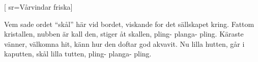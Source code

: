 [ 							
	sr={Vårvindar friska}]		
	
\beginverse*						
Vem sade ordet ``skål'' här vid bordet,
viskande for det sällskapet kring.
Fattom kristallen, nubben är kall den,
stiger åt skallen, pling- planga- pling.
Käraste vänner, välkomna hit,
känn hur den doftar god akvavit.
Nu lilla hutten, går i kaputten,
skål lilla tutten, pling- planga- pling.
\endverse		

\vspace{5mm}								
\endsong		
